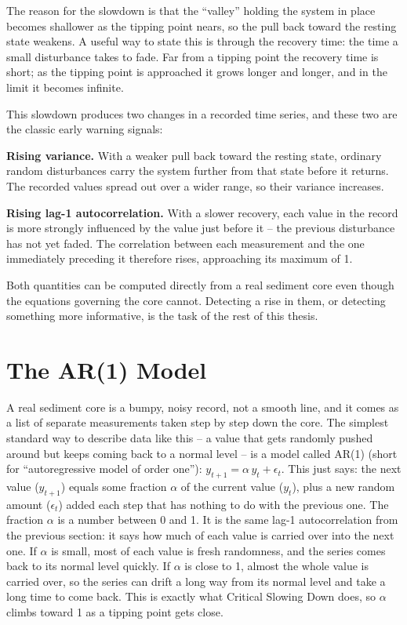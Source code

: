 The reason for the slowdown is that the ``valley'' holding the system in place becomes shallower as the tipping point nears, so the pull back toward the resting state weakens. A useful way to state this is through the recovery time: the time a small disturbance takes to fade. Far from a tipping point the recovery time is short; as the tipping point is approached it grows longer and longer, and in the limit it becomes infinite.

This slowdown produces two changes in a recorded time series, and these two are the classic early warning signals:

\textbf{Rising variance.} With a weaker pull back toward the resting state, ordinary random disturbances carry the system further from that state before it returns. The recorded values spread out over a wider range, so their variance increases.

\textbf{Rising lag-1 autocorrelation.} With a slower recovery, each value in the record is more strongly influenced by the value just before it -- the previous disturbance has not yet faded. The correlation between each measurement and the one immediately preceding it therefore rises, approaching its maximum of 1.

Both quantities can be computed directly from a real sediment core even though the equations governing the core cannot. Detecting a rise in them, or detecting something more informative, is the task of the rest of this thesis.

\section{The AR(1) Model}
\label{sec:ar1_model}
A real sediment core is a bumpy, noisy record, not a smooth line, and it comes as a list of separate measurements taken step by step down the core. The simplest standard way to describe data like this -- a value that gets randomly pushed around but keeps coming back to a normal level -- is a model called AR(1) (short for ``autoregressive model of order one''): $y_{t+1} = \alpha\, y_t + \epsilon_t$. This just says: the next value ($y_{t+1}$) equals some fraction $\alpha$ of the current value ($y_t$), plus a new random amount ($\epsilon_t$) added each step that has nothing to do with the previous one. The fraction $\alpha$ is a number between 0 and 1. It is the same lag-1 autocorrelation from the previous section: it says how much of each value is carried over into the next one. If $\alpha$ is small, most of each value is fresh randomness, and the series comes back to its normal level quickly. If $\alpha$ is close to 1, almost the whole value is carried over, so the series can drift a long way from its normal level and take a long time to come back. This is exactly what Critical Slowing Down does, so $\alpha$ climbs toward 1 as a tipping point gets close.

